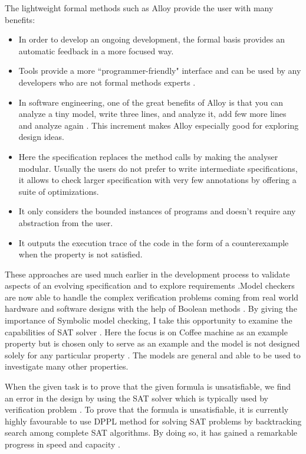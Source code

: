 \documentclass[a4paper,12pt]{report}
\begin{document}
The lightweight formal methods such as Alloy provide the user with many benefits:
\begin{itemize}
\item {In order to develop an ongoing development, the formal basis provides an automatic feedback in a more focused way.}
\item {Tools provide a more ``programmer-friendly" interface and can be used by any developers who are not formal methods experts} \cite{A.Blandford2000}.
\item {In software engineering, one of the great benefits of Alloy is that you can analyze a tiny model, write three lines, and analyze it, add few more lines and analyze again \cite{ErichGamma1995}. This increment makes Alloy especially good for exploring design ideas. }
\item {Here the specification replaces the method calls by making the analyser modular. Usually the users do not prefer to write intermediate specifications, it allows to check larger specification with very few annotations by offering a suite of optimizations.}
\item {It only considers the bounded instances of programs and  doesn't require any abstraction from the user.}
\item {It outputs the execution trace of the code in the form of a counterexample when the property is not satisfied.}

\end{itemize}

These approaches are used much earlier in the development process to validate aspects of an evolving specification and to explore requirements \cite{Hoare1986}.Model checkers are now able to handle the complex verification problems coming from real world hardware and software designs with the help of Boolean methods \cite{ErichGamma1995}. By giving the importance of Symbolic model checking, I take this opportunity to examine the capabilities of SAT solver \cite{R.Bryant1986}. Here the focus is on Coffee machine as an example property but is chosen only to serve as an example and the model is not designed solely for any particular property \cite{ErichGamma1995}. The models are general and able to be used to investigate many other properties.

When the given task is to prove that the given formula is unsatisfiable, we find an error in the design by using the SAT solver which is typically used by verification problem \cite{McMillan2003}. To prove that the formula is unsatisfiable, it is currently highly favourable to use DPPL method \cite{M.Davis1962} for solving SAT problems by backtracking search among complete SAT algorithms. By doing so, it has gained a remarkable progress in speed and capacity \cite{M.Moskewicz2001}.
\end{document}
